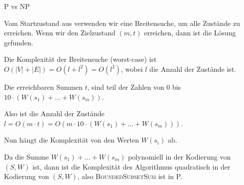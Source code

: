 \documentclass[answers]{submit}
\begin{document}
\begin{exercise}[6]{P vs NP}
{    Vom Startzustand aus verwenden wir eine Breitensuche, um alle Zustände zu erreichen.
    Wenn wir den Zielzustand $(m,t)$ erreichen, dann ist die Lösung gefunden.

    Die Komplexität der Breitensuche (worst-case) ist $O(|V|+|E|)=O(l+l^2)=O(l^2)$,
    wobei $l$ die Anzahl der Zustände ist.

    Die erreichbaren Summen $t$, sind teil der Zahlen von $0$ bis $10\cdot (W(s_1)+\dots+W(s_m))$.

    Also ist die Anzahl der Zustände $l=O(m\cdot t)=O(m\cdot 10\cdot (W(s_1)+\dots+W(s_m)))$.

    Nun hängt die Komplexität von den Werten $W(s_i)$ ab.

    Da die Summe $W(s_1)+\dots+W(s_m)$ polynomiell in der Kodierung von $(S,W)$ ist,
    dann ist die Komplexität des Algorithmus quadratisch in der Kodierung von $(S,W)$,
    also \textsc{BoundedSubsetSum} ist in P.

  }
\end{exercise}
\end{document}
